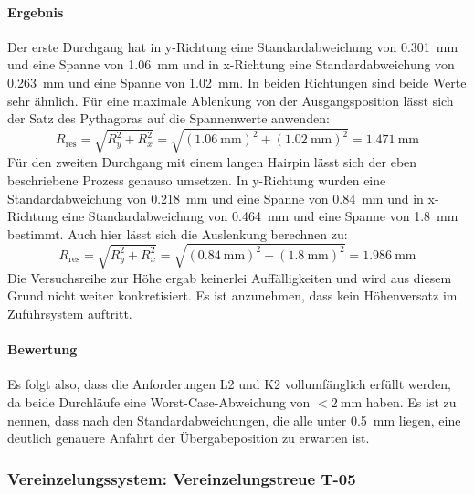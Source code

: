 \paragraph{Ergebnis}
Der erste Durchgang hat in y-Richtung eine Standardabweichung von \qty{0.301}{\milli\meter} und eine Spanne von \qty{1.06}{\milli\meter}
und in x-Richtung eine Standardabweichung von \qty{0.263}{\milli\meter} und eine Spanne von \qty{1.02}{\milli\meter}. In beiden Richtungen
sind beide Werte sehr ähnlich. Für eine maximale Ablenkung von der Ausgangsposition lässt sich der Satz des Pythagoras auf die
Spannenwerte anwenden:
%
\begin{equation}
  R_{\mathrm{res}} = \sqrt{R_y^2 + R_x^2}
  = \sqrt{(\qty{1.06}{\milli\meter})^2 + (\qty{1.02}{\milli\meter})^2}
  = \qty{1.471}{\milli\meter}
  \label{eq:T07_Durchgang1}
\end{equation}
%
Für den zweiten Durchgang mit einem langen Hairpin lässt sich der eben beschriebene Prozess genauso umsetzen. In y-Richtung wurden eine Standardabweichung
von \qty{0.218}{\milli\meter} und eine Spanne von \qty{0.84}{\milli\meter} und in x-Richtung eine Standardabweichung von
\qty{0.464}{\milli\meter} und eine Spanne von \qty{1.8}{\milli\meter} bestimmt. Auch hier lässt sich die Auslenkung berechnen zu:
%
\begin{equation}
  R_{\mathrm{res}} = \sqrt{R_y^2 + R_x^2}
  = \sqrt{(\qty{0.84}{\milli\meter})^2 + (\qty{1.8}{\milli\meter})^2}
  = \qty{1.986}{\milli\meter}
  \label{eq:T07_Durchgang2}
\end{equation}
%
Die Versuchsreihe zur Höhe ergab keinerlei Auffälligkeiten und wird aus diesem Grund nicht weiter konkretisiert. Es ist anzunehmen, dass
kein Höhenversatz im Zuführsystem auftritt.

\paragraph{Bewertung}
Es folgt also, dass die Anforderungen L2 und K2 vollumfänglich erfüllt werden, da beide Durchläufe eine Worst-Case-Abweichung von
$<\qty{2}{\milli\meter}$ haben. Es ist zu nennen, dass nach den Standardabweichungen, die alle unter \qty{0.5}{\milli\meter} liegen, eine
deutlich genauere Anfahrt der Übergabeposition zu erwarten ist.
%
\subsubsection{Vereinzelungssystem: Vereinzelungstreue T-05}\label{sec:VR_Vereinzelungstreue}

